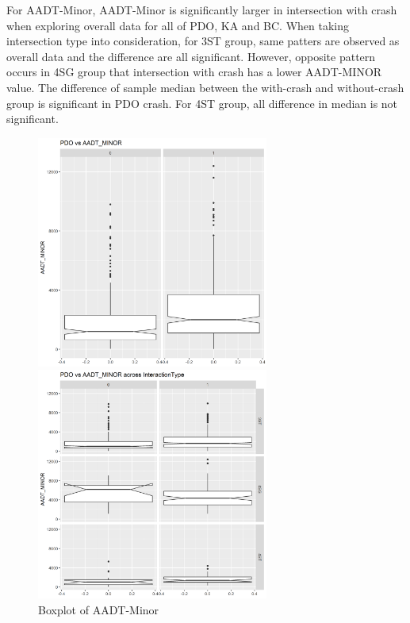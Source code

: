 \documentclass[11pt]{scrartcl} %
\begin{document}
For AADT-Minor, AADT-Minor is significantly larger in intersection with crash when exploring overall data for all of PDO, KA and BC. When taking intersection type into consideration, for 3ST group, same patters are observed as overall data and the difference are all significant. However, opposite pattern occurs in 4SG group that intersection with crash has a lower AADT-MINOR value. The difference of sample median between the with-crash and without-crash group is significant in PDO crash. For 4ST group, all difference in median is not significant.

\begin{figure}[H]
\begin{minipage}[t]{0.5\linewidth}
\centering
\includegraphics[width=3in]{image/minor_all_pdo.png}
\small
\end{minipage}
\begin{minipage}[t]{0.5\linewidth}
\centering
\includegraphics[width=3in]{image/minor_pdo.png}
\small
\end{minipage}
\caption{Boxplot of AADT-Minor}
\end{figure}
\end{document}
